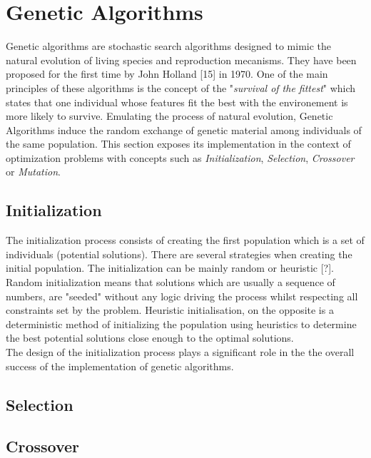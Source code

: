 \documentclass[twocolumn,10pt]{asme2ej}
\begin{document}
\section{Genetic Algorithms}
Genetic algorithms are stochastic search algorithms designed to mimic the natural evolution of living species and reproduction mecanisms. They have been proposed for the first time by John Holland [15] in 1970. One of the main principles of these algorithms is the concept of the "\emph{survival of the fittest}" which states that one individual whose features fit the best with the environement is more likely to survive. Emulating the process of natural evolution, Genetic Algorithms induce the random exchange of genetic material among individuals of the same population.
This section exposes its implementation in the context of optimization problems with concepts such as \emph{Initialization}, \emph{Selection}, \emph{Crossover} or \emph{Mutation}.
 
\subsection{Initialization}
The initialization process consists of creating the first population which is a set of individuals (potential solutions). There are several strategies when creating the initial population. The initialization can be mainly random or heuristic [?]. Random initialization means that solutions which are usually a sequence of numbers, are "seeded" without any logic driving the process whilst respecting all constraints set by the problem. 
Heuristic initialisation, on the opposite is a deterministic method of initializing the population using heuristics to determine the best potential solutions close enough to the optimal solutions. \\
The design of the initialization process plays a significant role in the the overall success of the implementation of genetic algorithms.

\subsection{Selection}

\subsection{Crossover}
\end{document}

